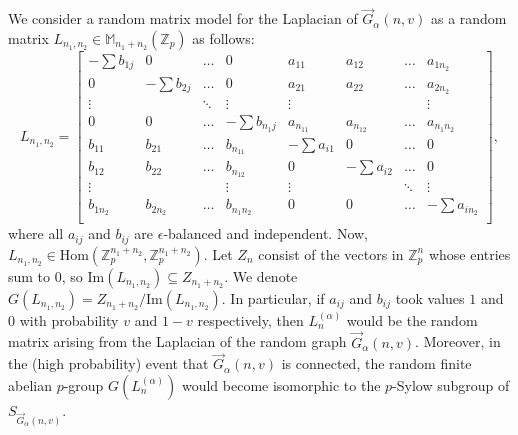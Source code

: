 \documentclass[12pt]{amsart}
\theoremstyle{definition}
\newcommand{\Lnot}{L_{n_1,n_2}}
\newcommand{\Lna}{L_{n}^{(\alpha)}}
\newcommand{\im}{\text{Im}}
\newcommand{\Znot}{Z_{n_1+n_2}}
\newcommand{\Zpnot}{\Z_p^{n_1+n_2}}
\newcommand{\MM}{\mathbb{M}}
\newcommand{\Z}{\mathbb{Z}}
\newcommand{\Hom}{\text{Hom}}
\begin{document}
We consider a random matrix model for the Laplacian of $\vec G_{\alpha}(n,v)$ as a random matrix $\Lnot\in \MM_{n_1+n_2}(\Z_p)$ as follows:
\[
\Lnot
=\begin{bmatrix}
-\sum b_{1j} & 0&  \dots & 0 & a_{11}& a_{12} & \dots & a_{1n_2}\\
0 & -\sum b_{2j} &\dots  & 0 & a_{21}& a_{22} & \dots & a_{2n_2}\\
\vdots & &\ddots & \vdots & \vdots & & & \vdots\\
0 & 0 &\dots  & -\sum b_{n_1j} & a_{n_11}& a_{n_12} & \dots & a_{n_1n_2}\\
b_{11}& b_{21} & \dots & b_{n_11} &-\sum a_{i1} & 0&  \dots & 0 \\
b_{12}& b_{22} & \dots & b_{n_12} &0 & -\sum a_{i2} &\dots  & 0 \\
\vdots & & & \vdots &\vdots & &\ddots & \vdots \\
b_{1n_2}& b_{2n_2} & \dots & b_{n_1n_2} &0 & 0 &\dots  & -\sum a_{in_2}\\
\end{bmatrix},
\]
where all $a_{ij}$ and $b_{ij}$ are $\epsilon$-balanced and independent.
Now, $\Lnot\in\Hom(\Zpnot,\Zpnot)$. Let $Z_n$ consist of the vectors in $\Z_p^n$ whose entries sum to $0$, so $\im(\Lnot) \subseteq \Znot$. We denote $G(\Lnot)=\Znot/\im(\Lnot)$.
In particular, if $a_{ij}$ and $b_{ij}$ took values $1$ and $0$ with probability $v$ and $1-v$ respectively, then $\Lna$ would be the random matrix arising from the Laplacian of the random graph $\vec G_{\alpha}(n,v)$.
Moreover, in the (high probability) event that $\vec G_{\alpha}(n,v)$ is connected, the random finite abelian $p$-group $G(\Lna)$ would become isomorphic to the $p$-Sylow subgroup of $S_{\vec G_{\alpha}(n,v)}$.
\end{document}
